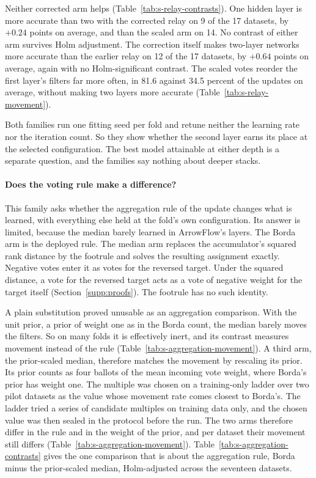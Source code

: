 Neither corrected arm helps (Table~\ref{tab:s-relay-contrasts}). One hidden layer is more accurate than two with the corrected relay on 9 of the 17 datasets, by $+0.24$ points on average, and than the scaled arm on 14. No contrast of either arm survives Holm adjustment. The correction itself makes two-layer networks more accurate than the earlier relay on 12 of the 17 datasets, by $+0.64$ points on average, again with no Holm-significant contrast. The scaled votes reorder the first layer's filters far more often, in 81.6 against 34.5 percent of the updates on average, without making two layers more accurate (Table~\ref{tab:s-relay-movement}).

Both families run one fitting seed per fold and retune neither the learning rate nor the iteration count. So they show whether the second layer earns its place at the selected configuration. The best model attainable at either depth is a separate question, and the families say nothing about deeper stacks.

\clearpage






\paragraph{Does the voting rule make a difference?} This family asks whether the aggregation rule of the update changes what is learned, with everything else held at the fold's own configuration. Its answer is limited, because the median barely learned in ArrowFlow's layers. The Borda arm is the deployed rule. The median arm replaces the accumulator's squared rank distance by the footrule and solves the resulting assignment exactly. Negative votes enter it as votes for the reversed target. Under the squared distance, a vote for the reversed target acts as a vote of negative weight for the target itself (Section~\ref{supp:proofs}). The footrule has no such identity.

A plain substitution proved unusable as an aggregation comparison. With the unit prior, a prior of weight one as in the Borda count, the median barely moves the filters. So on many folds it is effectively inert, and its contrast measures movement instead of the rule (Table~\ref{tab:s-aggregation-movement}). A third arm, the prior-scaled median, therefore matches the movement by rescaling its prior. Its prior counts as four ballots of the mean incoming vote weight, where Borda's prior has weight one. The multiple was chosen on a training-only ladder over two pilot datasets as the value whose movement rate comes closest to Borda's. The ladder tried a series of candidate multiples on training data only, and the chosen value was then sealed in the protocol before the run. The two arms therefore differ in the rule and in the weight of the prior, and per dataset their movement still differs (Table~\ref{tab:s-aggregation-movement}). Table~\ref{tab:s-aggregation-contrasts} gives the one comparison that is about the aggregation rule, Borda minus the prior-scaled median, Holm-adjusted across the seventeen datasets.

